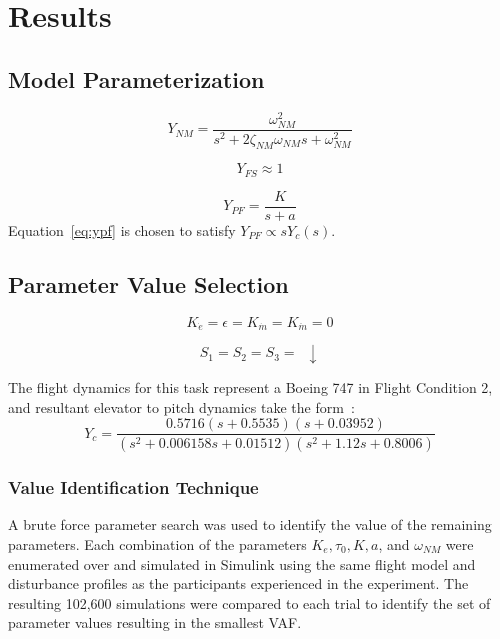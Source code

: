 \section{Results}

\subsection{Model Parameterization}
\begin{equation}
    Y_{NM} = \frac{\omega^2_{NM}}{s^2 + 2 \zeta_{NM} \omega_{NM} s + \omega^2_{NM}}
\end{equation}

\begin{equation}
    Y_{FS} \approx 1
\end{equation}

\begin{equation} \label{eq:ypf}
    Y_{PF} = \frac{K}{s+a}
\end{equation}
Equation~\ref{eq:ypf} is chosen to satisfy $Y_{PF} \propto s Y_c (s)$.

\subsection{Parameter Value Selection}

\begin{equation}
    K_{\dot{e}} = \epsilon = K_{\dot{m}} = K_{\ddot{m}} = 0
\end{equation}

\begin{equation}
    S_1 = S_2 = S_3 = \enspace \downarrow
\end{equation}


The flight dynamics for this task represent a Boeing 747 in Flight Condition 2, and resultant elevator to pitch dynamics take the form~\citep{heffley1972aircraft}:
\begin{equation}
    Y_c = \frac{0.5716 (s+0.5535) (s+0.03952)}{(s^2 + 0.006158s + 0.01512) (s^2 + 1.12s + 0.8006)}
\end{equation}

\subsubsection{Value Identification Technique}
A brute force parameter search was used to identify the value of the remaining parameters.
Each combination of the parameters $K_e, \tau_0, K, a$, and $\omega_{NM}$ were enumerated over and simulated in Simulink using the same flight model and disturbance profiles as the participants experienced in the experiment.
The resulting 102,600 simulations were compared to each trial to identify the set of parameter values resulting in the smallest VAF.

